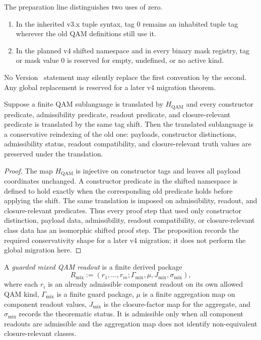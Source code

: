 \begin{definition}\label{def:pre-v4-reserved-zero-discipline}
The preparation line distinguishes two uses of zero.
\begin{enumerate}[leftmargin=2em]
  \item In the inherited v3.x tuple syntax, tag 0 remains an inhabited tuple tag wherever the old QAM definitions still use it.
  \item In the planned v4 shifted namespace and in every binary mask registry, tag or mask value 0 is reserved for empty, undefined, or no active kind.
\end{enumerate}
No Version~\docversion{} statement may silently replace the first convention by the second. Any global replacement is reserved for a later v4 migration theorem.
\end{definition}

\begin{proposition}\label{prop:qam-hilbert-shift-conservative-shape}
Suppose a finite QAM sublanguage is translated by $H_{\mathrm{QAM}}$ and every constructor predicate, admissibility predicate, readout predicate, and closure-relevant predicate is translated by the same tag shift. Then the translated sublanguage is a conservative reindexing of the old one: payloads, constructor distinctions, admissibility status, readout compatibility, and closure-relevant truth values are preserved under the translation.
\end{proposition}

\begin{proof}
The map $H_{\mathrm{QAM}}$ is injective on constructor tags and leaves all payload coordinates unchanged. A constructor predicate in the shifted namespace is defined to hold exactly when the corresponding old predicate holds before applying the shift. The same translation is imposed on admissibility, readout, and closure-relevant predicates. Thus every proof step that used only constructor distinction, payload data, admissibility, readout compatibility, or closure-relevant class data has an isomorphic shifted proof step. The proposition records the required conservativity shape for a later v4 migration; it does not perform the global migration here.
\end{proof}

\begin{definition}\label{def:guarded-mixed-qam-readout}
A \emph{guarded mixed QAM readout} is a finite derived package
\[
  R_{\mathrm{mix}}
  :=
  (r_1,\ldots,r_m;\Gamma_{\mathrm{mix}},\mu,J_{\mathrm{mix}},\sigma_{\mathrm{mix}}),
\]
where each $r_i$ is an already admissible component readout on its own allowed QAM kind, $\Gamma_{\mathrm{mix}}$ is a finite guard package, $\mu$ is a finite aggregation map on component readout values, $J_{\mathrm{mix}}$ is the closure-factor map for the aggregate, and $\sigma_{\mathrm{mix}}$ records the theorematic status. It is admissible only when all component readouts are admissible and the aggregation map does not identify non-equivalent closure-relevant classes.
\end{definition}


